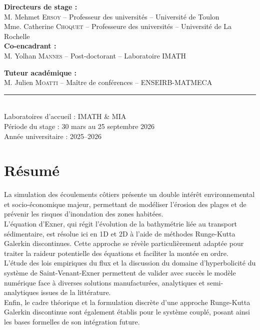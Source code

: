 \documentclass[11pt, a4paper, oneside]{report}
\begin{document}
\begin{titlepage}
\begin{minipage}[t]{0.8\textwidth}
        \textbf{Directeurs de stage :} \\
        M. Mehmet \textsc{Ersoy} -- Professeur des universités -- Université de Toulon \\[0.1cm]
        Mme. Catherine \textsc{Choquet} -- Professeure des universités -- Université de La Rochelle \\[0.25cm]
        \textbf{Co-encadrant :} \\
        M. Yolhan \textsc{Mannes} -- Post-doctorant -- Laboratoire IMATH

        \vspace{0.4cm}

        \textbf{Tuteur académique :} \\
        M. Julien \textsc{Moatti} -- Maître de conférences -- ENSEIRB-MATMECA
    \end{minipage}

    \vfill

    \begin{center}
        \rule{0.5\textwidth}{0.4pt}\\[0.3cm]
        Laboratoires d'accueil : IMATH \& MIA \\
        Période du stage : 30 mars au 25 septembre 2026 \\
        Année universitaire : 2025--2026
    \end{center}

\end{titlepage}

\thispagestyle{empty}
\section*{Résumé}

La simulation des écoulements côtiers présente un double intérêt environnemental et socio-économique majeur, permettant de modéliser l'érosion des plages et de prévenir les risques d'inondation des zones habitées. \\
L'équation d'Exner, qui régit l'évolution de la bathymétrie liée au transport sédimentaire, est résolue ici en 1D et 2D à l'aide de méthodes Runge-Kutta Galerkin discontinues. Cette approche se révèle particulièrement adaptée pour traiter la raideur potentielle des équations et faciliter la montée en ordre. \\
L'étude des lois empiriques du flux et la discussion du domaine d'hyperbolicité du système de Saint-Venant-Exner permettent de valider avec succès le modèle numérique face à diverses solutions manufacturées, analytiques et semi-analytiques issues de la littérature. \\
Enfin, le cadre théorique et la formulation discrète d'une approche Runge-Kutta Galerkin discontinue sont également établis pour le système couplé, posant ainsi les bases formelles de son intégration future. \\
\end{document}

